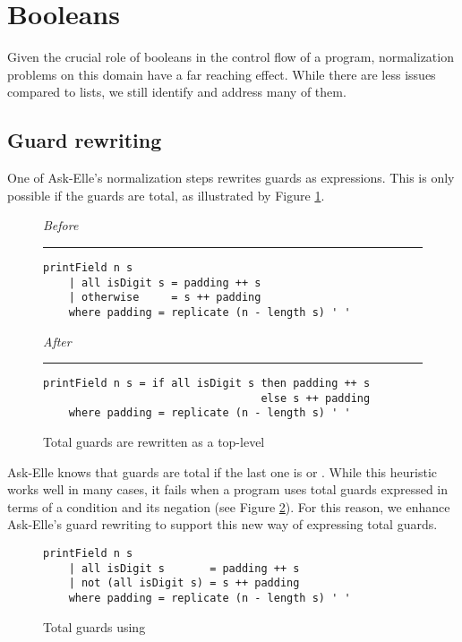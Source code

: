 \section{Booleans}

Given the crucial role of booleans in the control flow of a program, normalization problems on this domain have a far reaching effect. While there are less issues compared to lists, we still identify and address many of them.

\subsection{Guard rewriting}

One of Ask-Elle's normalization steps rewrites guards as  expressions. This is only possible if the guards are total, as illustrated by Figure \ref{fig:ex3-total-guards}.

\begin{figure}
\centering
\emph{Before}
\noindent\rule{\linewidth}{0.5pt}
\begin{verbatim}
printField n s
    | all isDigit s = padding ++ s
    | otherwise     = s ++ padding
    where padding = replicate (n - length s) ' '
\end{verbatim}
\bigskip
\emph{After}
\noindent\rule{\linewidth}{0.5pt}
\begin{verbatim}
printField n s = if all isDigit s then padding ++ s
                                  else s ++ padding
    where padding = replicate (n - length s) ' '
\end{verbatim}
\bigskip
\caption{Total guards are rewritten as a top-level }
\label{fig:ex3-total-guards}
\end{figure}

Ask-Elle knows that guards are total if the last one is  or . While this heuristic works well in many cases, it fails when a program uses total guards expressed in terms of a condition and its negation (see Figure \ref{fig:ex3-total-guards-not}). For this reason, we enhance Ask-Elle's guard rewriting to support this new way of expressing total guards.

\begin{figure}
\begin{verbatim}
printField n s
    | all isDigit s       = padding ++ s
    | not (all isDigit s) = s ++ padding
    where padding = replicate (n - length s) ' '
\end{verbatim}
\caption{Total guards using }
\label{fig:ex3-total-guards-not}
\end{figure}

